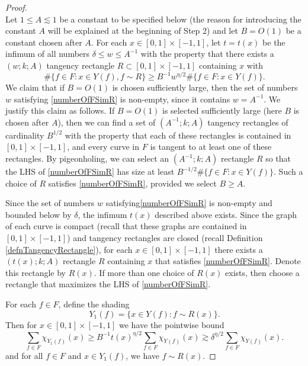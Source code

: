 \documentclass[letterpaper, reqno,11pt]{article}
\numberwithin{equation}{section}
\numberwithin{thm}{section}
\theoremstyle{remark}
\begin{document}
\begin{proof}$\phantom{1}$\\
%
 Let $1\leq A\lesssim 1$ be a constant to be specified below (the reason for introducing the constant $A$ will be explained at the beginning of Step 2) and let $B=O(1)$ be a constant chosen after $A$. For each $x\in[0,1]\times[-1,1]$, let $t=t(x)$ be the infimum of all numbers $\delta\leq w\leq A^{-1}$ with the property that there exists a $(w;k; A)$ tangency rectangle $R\subset[0,1]\times[-1,1]$ containing $x$ with
\begin{equation}\label{numberOfFSimR}
\#\{f\in F\colon x\in Y(f), f\sim R\} \geq B^{-1} w^{\eta/2}\#\{f\in F\colon x\in Y(f)\}.
\end{equation}
We claim that if $B=O(1)$ is chosen sufficiently large, then the set of numbers $w$ satisfying \eqref{numberOfFSimR} is non-empty, since it contains $w=A^{-1}$. We justify this claim as follows. If $B=O(1)$ is selected sufficiently large (here $B$ is chosen after $A$), then we can find a set of $(A^{-1}; k; A)$ tangency rectangles of cardinality $B^{1/2}$ with the property that each of these rectangles is contained in $[0,1]\times[-1,1]$, and every curve in $F$ is tangent to at least one of these rectangles. By pigeonholing, we can select an $(A^{-1}; k; A)$ rectangle $R$ so that the LHS of \eqref{numberOfFSimR} has size at least $B^{-1/2}\#\{f\in F\colon x\in Y(f)\}$. Such a choice of $R$ satisfies \eqref{numberOfFSimR}, provided we select $B\geq A$.

Since the set of numbers $w$ satisfying\eqref{numberOfFSimR} is non-empty and bounded below by $\delta$, the infimum $t(x)$ described above exists. Since the graph of each curve is compact (recall that these graphs are contained in $[0,1]\times[-1,1]$) and tangency rectangles are closed (recall Definition \ref{defnTangencyRectangle}), for each $x\in[0,1]\times[-1,1]$ there exists a $(t(x); k; A)$ rectangle $R$ containing $x$ that satisfies \eqref{numberOfFSimR}. Denote this rectangle by $R(x)$. If more than one choice of $R(x)$ exists, then choose a rectangle that maximizes the LHS of \eqref{numberOfFSimR}.

For each $f\in F$, define the shading
\[
Y_1(f) = \{x\in Y(f)\colon f\sim R(x)\}.
\]
Then for $x\in[0,1]\times [-1,1]$ we have the pointwise bound
\begin{equation}\label{LInftyNormNotMuchSmaller}
\sum_{f\in F}\chi_{Y_1(f)}(x) \geq B^{-1} t(x)^{\eta/2} \sum_{f\in F}\chi_{Y(f)}(x) \gtrsim \delta^{\eta/2} \sum_{f\in F}\chi_{Y(f)}(x).
\end{equation}
and for all $f\in F$ and $x\in Y_1(f)$, we have $f\sim R(x)$. 


\end{proof}
\end{document}
